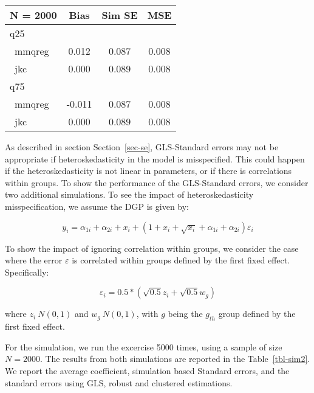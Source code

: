 \documentclass[
  authoryear,
  review,
  1p]{elsarticle}
\begin{document}
\begin{table}
\begin{minipage}[t]{0.50\linewidth}
{}

\end{minipage}%
%
\begin{minipage}[t]{0.50\linewidth}

{\centering 

\begin{longtable}[]{@{}lccc@{}}
\toprule\noalign{}
N = 2000 & Bias & Sim SE & MSE \\
\midrule\noalign{}
\endhead
\bottomrule\noalign{}
\endlastfoot
q25 & & & \\
~mmqreg & 0.012 & 0.087 & 0.008 \\
~jkc & 0.000 & 0.089 & 0.008 \\
q75 & & & \\
~mmqreg & -0.011 & 0.087 & 0.008 \\
~jkc & 0.000 & 0.089 & 0.008 \\
\end{longtable}

}

\end{minipage}%

\end{table}

As described in section Section~\ref{sec-se}, GLS-Standard errors may
not be appropriate if heteroskedasticity in the model is misspecified.
This could happen if the heteroskedasticity is not linear in parameters,
or if there is correlations within groups. To show the performance of
the GLS-Standard errors, we consider two additional simulations. To see
the impact of heteroskedasticity misspecification, we assume the DGP is
given by:

\[y_i = \alpha_{1i} + \alpha_{2i} + x_i + (1+x_i + \sqrt{x_i} +\alpha_{1i} + \alpha_{2i} ) \varepsilon_i
\]

To show the impact of ignoring correlation within groups, we consider
the case where the error \(\varepsilon\) is correlated within groups
defined by the first fixed effect. Specifically:

\[\varepsilon_i =0.5*(\sqrt{0.5} z_i + \sqrt{0.5} w_g)\]

where \(z_i~N(0,1)\) and \(w_g~N(0,1)\), with \(g\) being the \(g_{th}\)
group defined by the first fixed effect.

For the simulation, we run the excercise 5000 times, using a sample of
size \(N=2000\). The results from both simulations are reported in the
Table~\ref{tbl-sim2}. We report the average coefficient, simulation
based Standard errors, and the standard errors using GLS, robust and
clustered estimations.
\end{document}
